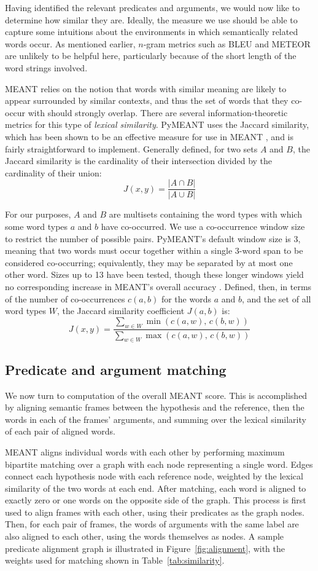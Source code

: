 \documentclass[11pt,twocolumn]{article}
\begin{document}
Having identified the relevant predicates and arguments, we would now
like to determine how similar they are.
Ideally, the measure we use should be able to capture some intuitions
about the environments in which semantically related words occur.
As mentioned earlier, $n$-gram metrics such as BLEU and METEOR are
unlikely to be helpful here, particularly because of the short length
of the word strings involved.

MEANT relies on the notion that words with similar meaning are likely to
appear surrounded by similar contexts, and thus the set of words that
they co-occur with should strongly overlap.
There are several information-theoretic metrics for this type of
\textit{lexical similarity}.
PyMEANT uses the Jaccard similarity, which has been shown to be an
effective measure for use in MEANT \cite{Tumuluru:2012}, and is fairly
straightforward to implement.
Generally defined, for two sets $A$ and $B$, the Jaccard similarity is
the cardinality of their intersection divided by the cardinality of
their union:
\[
J(x,y)=\frac{\left|A\cap B\right|}{\left|A\cup B\right|}
\]

For our purposes, $A$ and $B$ are multisets containing the word types
with which some word types $a$ and $b$ have co-occurred.
We use a co-occurrence window size to restrict the number of possible
pairs.
PyMEANT's default window size is 3, meaning that two words must occur
together within a single 3-word span to be considered co-occurring;
equivalently, they may be separated by at most one other word.
Sizes up to 13 have been tested,
though these longer windows yield no corresponding increase in MEANT's
overall accuracy \cite{Tumuluru:2012}.
Defined, then, in terms of the number of co-occurrences $c(a,b)$ for
the words $a$ and $b$, and the set of all word types $W$, the Jaccard
similarity coefficient $J(a,b)$ is:
\[
J(x,y)=\frac{\sum_{w\in W}\min(c(a,w),\,c(b,w))}
            {\sum_{w\in W}\max(c(a,w),\,c(b,w))}
\]


\subsection{Predicate and argument matching}

We now turn to computation of the overall MEANT score.
This is accomplished by aligning semantic frames between the hypothesis
and the reference, then the words in each of the frames' arguments, and
summing over the lexical similarity of each pair of aligned words.

MEANT aligns individual words with each other by performing maximum
bipartite matching over a graph with each node representing a single
word.
Edges connect each hypothesis node with each reference node, weighted
by the lexical similarity of the two words at each end.
After matching, each word is aligned to exactly zero or one words on the
opposite side of the graph.
This process is first used to align frames with each other, using their
predicates as the graph nodes.
Then, for each pair of frames, the words of arguments with the same
label are also aligned to each other, using the words themselves as
nodes.
A sample predicate alignment graph is illustrated in
Figure~\ref{fig:alignment}, with the weights used for matching shown in
Table~\ref{tab:similarity}.
\end{document}
